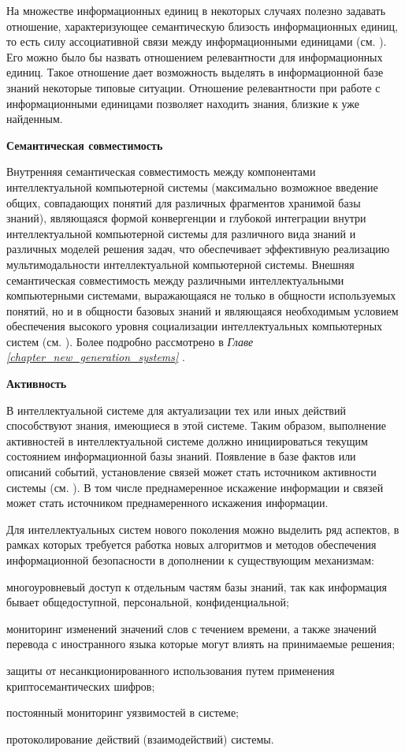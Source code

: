 На множестве информационных единиц в некоторых случаях полезно задавать отношение, характеризующее семантическую близость информационных единиц, то есть силу ассоциативной связи между информационными единицами (см. ). Его можно было бы назвать отношением релевантности для информационных единиц. Такое отношение дает возможность выделять в информационной базе знаний некоторые типовые ситуации. Отношение релевантности при работе с информационными единицами позволяет находить знания, близкие к уже найденным.

\textbf{Семантическая совместимость}

Внутренняя семантическая совместимость между компонентами интеллектуальной компьютерной системы (максимально возможное введение общих, совпадающих понятий для различных фрагментов хранимой базы знаний), являющаяся формой конвергенции и глубокой интеграции внутри интеллектуальной компьютерной системы для различного вида знаний и различных моделей решения задач, что обеспечивает эффективную реализацию мультимодальности интеллектуальной компьютерной системы. Внешняя семантическая совместимость между различными интеллектуальными компьютерными системами, выражающаяся не только в общности используемых понятий, но и в общности базовых знаний и являющаяся необходимым условием обеспечения высокого уровня социализации интеллектуальных компьютерных систем (см. ). Более подробно рассмотрено в \textit{Главе \ref{chapter_new_generation_systems} }.

\textbf{Активность}

В интеллектуальной системе для актуализации тех или иных действий способствуют знания, имеющиеся в этой системе. Таким образом, выполнение активностей в интеллектуальной системе должно инициироваться текущим состоянием информационной базы знаний. Появление в базе фактов или описаний событий, установление связей может стать источником активности системы (см. ). В том числе преднамеренное искажение информации и связей может стать источником преднамеренного искажения информации.

Для интеллектуальных систем нового поколения можно выделить ряд аспектов, в рамках которых требуется работка новых алгоритмов и методов обеспечения информационной безопасности в дополнении к существующим механизмам:

\begin{textitemize}
	\item многоуровневый доступ к отдельным частям базы знаний, так как информация бывает общедоступной, персональной, конфиденциальной;
	\item мониторинг изменений значений слов с течением времени, а также значений перевода с иностранного языка которые могут влиять на принимаемые решения;
	\item защиты от несанкционированного использования путем применения криптосемантических шифров;
	\item постоянный мониторинг уязвимостей в системе;
	\item протоколирование действий (взаимодействий) системы.
\end{textitemize}

